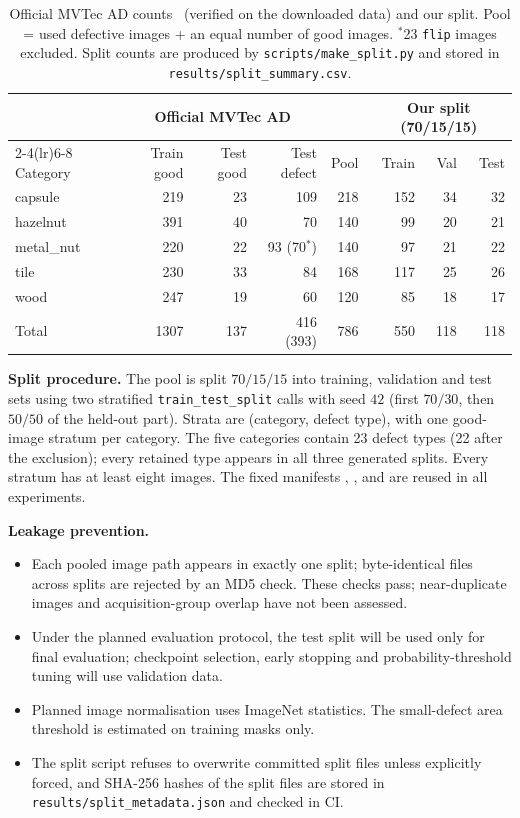 \documentclass[11pt,a4paper]{article}
\begin{document}
\begin{table}[h]
\centering
\small
\setlength{\tabcolsep}{4pt}
\begin{tabular}{lrrrrrrr}
\toprule
 & \multicolumn{3}{c}{Official MVTec AD} & & \multicolumn{3}{c}{Our split (70/15/15)} \\
\cmidrule(lr){2-4}\cmidrule(lr){6-8}
Category & Train good & Test good & Test defect & Pool & Train & Val & Test \\
\midrule
capsule    & 219 & 23 & 109 & 218 & 152 & 34 & 32 \\
hazelnut   & 391 & 40 & 70  & 140 & 99  & 20 & 21 \\
metal\_nut & 220 & 22 & 93 (70$^{*}$) & 140 & 97 & 21 & 22 \\
tile       & 230 & 33 & 84  & 168 & 117 & 25 & 26 \\
wood       & 247 & 19 & 60  & 120 & 85  & 18 & 17 \\
\midrule
Total      & 1307 & 137 & 416 (393) & 786 & 550 & 118 & 118 \\
\bottomrule
\end{tabular}
\caption{Official MVTec AD counts~\cite{mvtec} (verified on the downloaded data) and our split. Pool = used defective images + an equal number of good images. $^{*}$23 \texttt{flip} images excluded. Split counts are produced by \texttt{scripts/make\_split.py} and stored in \texttt{results/split\_summary.csv}.}
\label{tab:data}
\end{table}

\textbf{Split procedure.} The pool is split $70/15/15$ into training, validation and test sets using two stratified \texttt{train\_test\_split} calls with seed $42$ (first $70/30$, then $50/50$ of the held-out part). Strata are (category, defect type), with one good-image stratum per category. The five categories contain 23 defect types (22 after the exclusion); every retained type appears in all three generated splits. Every stratum has at least eight images. The fixed manifests , , and  are reused in all experiments.

\textbf{Leakage prevention.}
\begin{itemize}
  \item Each pooled image path appears in exactly one split; byte-identical files across splits are rejected by an MD5 check. These checks pass; near-duplicate images and acquisition-group overlap have not been assessed.
  \item Under the planned evaluation protocol, the test split will be used only for final evaluation; checkpoint selection, early stopping and probability-threshold tuning will use validation data.
  \item Planned image normalisation uses ImageNet statistics. The small-defect area threshold is estimated on training masks only.
  \item The split script refuses to overwrite committed split files unless explicitly forced, and SHA-256 hashes of the split files are stored in \texttt{results/split\_metadata.json} and checked in CI.
\end{itemize}
\end{document}
